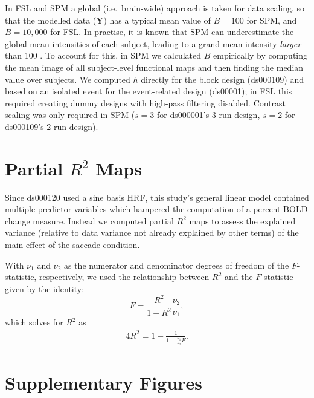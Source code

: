 In FSL and SPM a global (i.e.\ brain-wide) approach is taken for data scaling, so that the modelled data ($\bm{Y}$) has a typical mean value of $B=100$ for SPM, and $B=10,000$ for FSL. In practise, it is known that SPM can underestimate the global mean intensities of each subject, leading to a grand mean intensity \textit{larger} than 100 \citep{Nichols2012-rx}. To account for this, in SPM we calculated $B$ empirically by computing the mean image of all subject-level functional maps and then finding the median value over subjects.  We computed $h$ directly for the block design (ds000109) and based on an isolated event for the event-related design (ds00001); in FSL this required creating dummy designs with high-pass filtering disabled.  Contrast scaling was only required in SPM ($s=3$ for ds000001's 3-run design, $s=2$ for ds000109's 2-run design).



\pagebreak

\section{Partial $R^{2}$ Maps}
\label{App:SC_supplementary_R2}

Since ds000120 used a sine basis HRF, this study's general linear model contained multiple predictor variables which hampered the computation of a percent BOLD change measure.  Instead we computed partial $R^{2}$ maps to assess the explained variance (relative to data variance not already explained by other terms) of the main effect of the saccade condition.

With $\nu_{1}$ and $\nu_{2}$ as the numerator and denominator degrees of freedom of the $F$-statistic, respectively, we used the relationship between $R^{2}$ and the $F$-statistic given by the identity:
%
\begin{equation}
\label{eq:SC_sup_F_to_R}
F = \frac{R^2}{1-R^2}  \frac{\nu_2}{\nu_1},
\end{equation}
%
which solves for $R^{2}$ as
%
\begin{alignat}{4}\label{eq:SC_sup_R_to_F}
  R^2 =  1 - \frac{1}{1 + \frac{\nu_1}{\nu_2} F}.
\end{alignat}

\pagebreak

\section{Supplementary Figures}
\label{App:SC_supplementary_figures}

